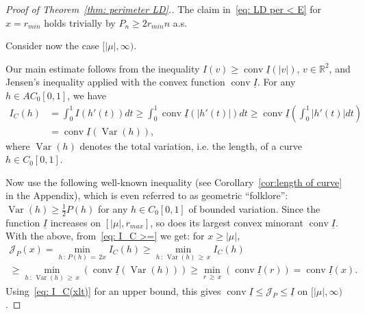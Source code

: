 \documentclass[10pt]{amsart}
\theoremstyle{definition}\newtheorem{defi}[theo]{Definition}\newtheorem{rema}[theo]{Remark}\newtheorem{exam}[theo]{Example}\newtheorem{exem}[theo]{Example}\newtheorem{nota}[theo]{Notation}
\DeclareMathOperator{\conv}{conv}
\newcommand{\ubar}[1]{\underline{#1}}
\newcommand{\Rbb}{\mathbb{R}}
\newcommand{\Jcl}{\mathcal{J}}
\newcommand{\Var}{\mathop{\mathrm{Var}}\nolimits}
\begin{document}
\begin{proof}[Proof of Theorem~\ref{thm: perimeter LD}.]
The claim in~\eqref{eq: LD per < E} for $x = r_{min}$ holds trivially by $P_n \ge 2 r_{min} n$ a.s.

Consider now the case $[|\mu|, \infty)$.

Our main estimate follows from the inequality $I(v) \ge \conv \ubar I(|v|)$, $v \in \Rbb^2$, and Jensen's inequality applied with the convex function $\conv \ubar I$. For any $h \in AC_0[0,1]$, we have
\begin{equation}\label{eq: I_C >=}
\begin{aligned}
I_C(h) &= \int_0^1 I(h'(t)) dt \ge \int_0^1 \conv \ubar I(|h'(t)|) dt
\ge \conv \ubar I \left(\int_0^1 |h'(t) | dt\right)  \\
&= \conv \ubar I \left(\Var(h) \right), 
\end{aligned}
\end{equation}
where $\Var(h)$ denotes the total variation, i.e. the length, of a curve $h \in C_0[0,1]$.

Now use the following well-known inequality (see Corollary~\ref{cor:length of curve} in the Appendix), which is even referred to as geometric ``folklore'': $\Var(h) \ge \frac12 P(h)$ for any $h \in C_0[0,1]$ of bounded variation. Since the function $\ubar I$ increases on $[|\mu|, r_{max}]$, so does its largest convex minorant $\conv \ubar I$. With the above, from~\eqref{eq: I_C >=} we get: for $x \ge |\mu|$,
\begin{multline}\label{eq: I_C >= 2}
\Jcl_P(x)=\min_{h\,:\,P(h)\,=\,2x} I_C(h) \ge \min_{h\,:\, \Var(h)\,\ge\,x} I_C(h) \\
\ge \min_{h\,:\,\Var(h)\,\ge\,x} \left(\conv \ubar I \left(\Var(h) \right) \right) \ge \min_{r\,\ge\,x} \left(\conv \ubar I \left(r \right) \right) = \conv \ubar I(x). 
\end{multline}
Using~\eqref{eq: I_C(xlt)} for an upper bound, this gives $\conv \ubar I \leqslant \Jcl_P \leqslant \ubar I $ on $[|\mu|, \infty)$.


\end{proof}
\end{document}
